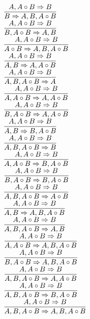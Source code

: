 \documentclass[11pt]{article}
\begin{document}
\begin{center}
\bigskip
\\$\infer{B\Rightarrow A, B, A\circ B}{A, A\circ B\Rightarrow B}$
\bigskip
\\$\infer{B, A\circ B\Rightarrow A, B}{A, A\circ B\Rightarrow B}$
\bigskip
\\$\infer{A\circ B\Rightarrow A, B, A\circ B}{A, A\circ B\Rightarrow B}$
\bigskip
\\$\infer{A, B\Rightarrow A, A\circ B}{A, A\circ B\Rightarrow B}$
\bigskip
\\$\infer{A, B, A\circ B\Rightarrow A}{A, A\circ B\Rightarrow B}$
\bigskip
\\$\infer{A, A\circ B\Rightarrow A, A\circ B}{A, A\circ B\Rightarrow B}$
\bigskip
\\$\infer{B, A\circ B\Rightarrow A, A\circ B}{A, A\circ B\Rightarrow B}$
\bigskip
\\$\infer{A, B\Rightarrow B, A\circ B}{A, A\circ B\Rightarrow B}$
\bigskip
\\$\infer{A, B, A\circ B\Rightarrow B}{A, A\circ B\Rightarrow B}$
\bigskip
\\$\infer{A, A\circ B\Rightarrow B, A\circ B}{A, A\circ B\Rightarrow B}$
\bigskip
\\$\infer{B, A\circ B\Rightarrow B, A\circ B}{A, A\circ B\Rightarrow B}$
\bigskip
\\$\infer{A, B, A\circ B\Rightarrow A\circ B}{A, A\circ B\Rightarrow B}$
\bigskip
\\$\infer{A, B\Rightarrow A, B, A\circ B}{A, A\circ B\Rightarrow B}$
\bigskip
\\$\infer{A, B, A\circ B\Rightarrow A, B}{A, A\circ B\Rightarrow B}$
\bigskip
\\$\infer{A, A\circ B\Rightarrow A, B, A\circ B}{A, A\circ B\Rightarrow B}$
\bigskip
\\$\infer{B, A\circ B\Rightarrow A, B, A\circ B}{A, A\circ B\Rightarrow B}$
\bigskip
\\$\infer{A, B, A\circ B\Rightarrow A, A\circ B}{A, A\circ B\Rightarrow B}$
\bigskip
\\$\infer{A, B, A\circ B\Rightarrow B, A\circ B}{A, A\circ B\Rightarrow B}$
\bigskip
\\$\infer{A, B, A\circ B\Rightarrow A, B, A\circ B}{A, A\circ B\Rightarrow B}$
\bigskip
\\
\end{center}
\end{document}
